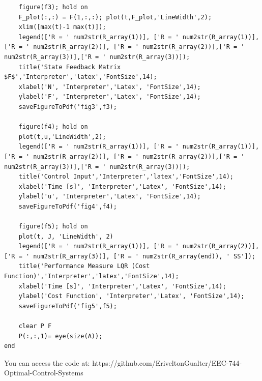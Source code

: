 \documentclass{article}
\begin{document}
\begin{lstlisting}
    figure(f3); hold on
    F_plot(:,:) = F(1,:,:); plot(t,F_plot,'LineWidth',2);
    xlim([max(t)-1 max(t)]);
    legend(['R = ' num2str(R_array(1))], ['R = ' num2str(R_array(1))], ['R = ' num2str(R_array(2))], ['R = ' num2str(R_array(2))],['R = ' num2str(R_array(3))],['R = ' num2str(R_array(3))]);
    title('State Feedback Matrix $F$','Interpreter','latex','FontSize',14); 
    xlabel('N', 'Interpreter','Latex', 'FontSize',14);
    ylabel('F', 'Interpreter','Latex', 'FontSize',14);
    saveFigureToPdf('fig3',f3);

    figure(f4); hold on
    plot(t,u,'LineWidth',2);
    legend(['R = ' num2str(R_array(1))], ['R = ' num2str(R_array(1))], ['R = ' num2str(R_array(2))], ['R = ' num2str(R_array(2))],['R = ' num2str(R_array(3))],['R = ' num2str(R_array(3))]);
    title('Control Input','Interpreter','latex','FontSize',14); 
    xlabel('Time [s]', 'Interpreter','Latex', 'FontSize',14);
    ylabel('u', 'Interpreter','Latex', 'FontSize',14);
    saveFigureToPdf('fig4',f4);
    
    figure(f5); hold on
    plot(t, J, 'LineWidth', 2)
    legend(['R = ' num2str(R_array(1))], ['R = ' num2str(R_array(2))], ['R = ' num2str(R_array(3))], ['R = ' num2str(R_array(end)), ' SS']);
    title('Performance Measure LQR (Cost Function)','Interpreter','latex','FontSize',14); 
    xlabel('Time [s]', 'Interpreter','Latex', 'FontSize',14);
    ylabel('Cost Function', 'Interpreter','Latex', 'FontSize',14);
    saveFigureToPdf('fig5',f5);
    
    clear P F
    P(:,:,1)= eye(size(A));
end
\end{lstlisting}

You can access the code at: https://github.com/EriveltonGualter/EEC-744-Optimal-Control-Systems
\end{document}
